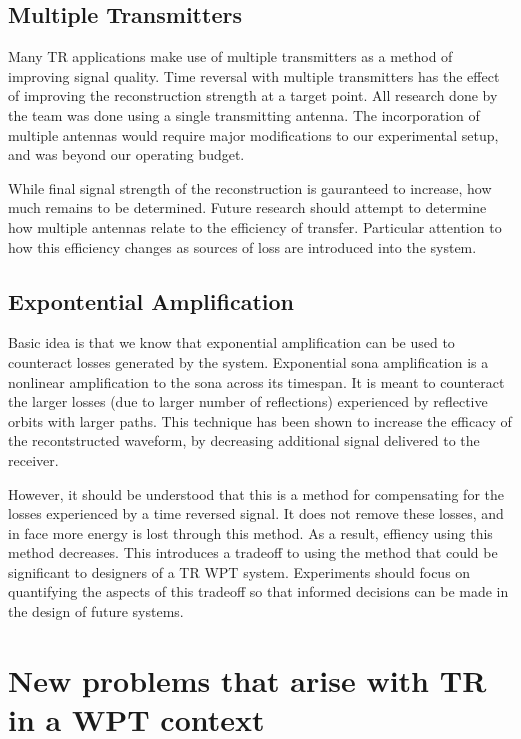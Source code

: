 \subsection{Multiple Transmitters}

Many TR applications make use of multiple transmitters as a method of improving signal quality. Time reversal with multiple transmitters has the effect of improving the reconstruction strength at a target point.  All research done by the team was done using a single transmitting antenna. The incorporation of multiple antennas would require major modifications to our experimental setup, and was beyond our operating budget.

While final signal strength of the reconstruction is gauranteed to increase, how much remains to be determined. Future research should attempt to determine how multiple antennas relate to the efficiency of transfer. Particular attention to how this efficiency changes as sources of loss are introduced into the system.

\subsection{Expontential Amplification}


Basic idea is that we know that exponential amplification can be used to counteract losses generated by the system. Exponential sona amplification is a nonlinear amplification to the sona across its timespan. It is meant to counteract the larger losses (due to larger number of reflections) experienced by reflective orbits with larger paths. This technique has been shown to increase the efficacy of the recontstructed waveform, by decreasing additional signal delivered to the receiver.

However, it should be understood that this is a method for compensating for the losses experienced by a time reversed signal. It does not remove these losses, and in face more energy is lost through this method. As a result, effiency using this method decreases. This introduces a tradeoff to using the method that could be significant to designers of a TR WPT system. Experiments should focus on quantifying the aspects of this tradeoff so that informed decisions can be made in the design of future systems.

\section{New problems that arise with TR in a WPT context}
\label{sec:future-wpt}

